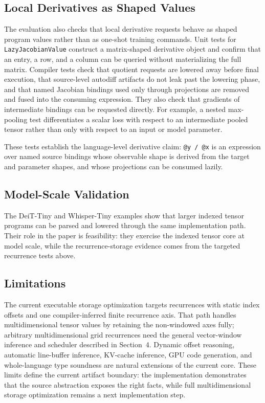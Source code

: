 \documentclass[sigplan,screen,nonacm]{acmart}
\begin{document}
\subsection{Local Derivatives as Shaped Values}

The evaluation also checks that local derivative requests behave as shaped program values rather than as one-shot training commands. Unit tests for \texttt{LazyJacobianValue} construct a matrix-shaped derivative object and confirm that an entry, a row, and a column can be queried without materializing the full matrix. Compiler tests check that quotient requests are lowered away before final execution, that source-level autodiff artifacts do not leak past the lowering phase, and that named Jacobian bindings used only through projections are removed and fused into the consuming expression. They also check that gradients of intermediate bindings can be requested directly. For example, a nested max-pooling test differentiates a scalar loss with respect to an intermediate pooled tensor rather than only with respect to an input or model parameter.

These tests establish the language-level derivative claim: \texttt{@y / @x} is an expression over named source bindings whose observable shape is derived from the target and parameter shapes, and whose projections can be consumed lazily.

\subsection{Model-Scale Validation}

The DeiT-Tiny and Whisper-Tiny examples show that larger indexed tensor programs can be parsed and lowered through the same implementation path. Their role in the paper is feasibility: they exercise the indexed tensor core at model scale, while the recurrence-storage evidence comes from the targeted recurrence tests above.

\subsection{Limitations}

The current executable storage optimization targets recurrences with static index offsets and one compiler-inferred finite recurrence axis. That path handles multidimensional tensor values by retaining the non-windowed axes fully; arbitrary multidimensional grid recurrences need the general vector-window inference and scheduler described in Section~4. Dynamic offset reasoning, automatic line-buffer inference, KV-cache inference, GPU code generation, and whole-language type soundness are natural extensions of the current core. These limits define the current artifact boundary: the implementation demonstrates that the source abstraction exposes the right facts, while full multidimensional storage optimization remains a next implementation step.
\end{document}
